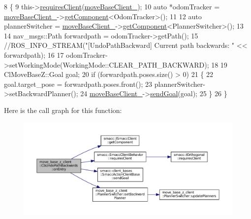 \begin{DoxyCode}
8 \{
9     this->\hyperlink{classsmacc_1_1SmaccClientBehavior_a917f001e763a1059af337bf4e164f542}{requiresClient}(\hyperlink{classmove__base__z__client_1_1CbUndoPathBackwards_a19e7ace85698725a1d2730a7c6b3aa7d}{moveBaseClient\_});
10     \textcolor{keyword}{auto} *odomTracker = \hyperlink{classmove__base__z__client_1_1CbUndoPathBackwards_a19e7ace85698725a1d2730a7c6b3aa7d}{moveBaseClient\_}->\hyperlink{classsmacc_1_1ISmaccClient_adef78db601749ca63c19e74a27cb88cc}{getComponent}<OdomTracker>();
11 
12     \textcolor{keyword}{auto} plannerSwitcher = \hyperlink{classmove__base__z__client_1_1CbUndoPathBackwards_a19e7ace85698725a1d2730a7c6b3aa7d}{moveBaseClient\_}->\hyperlink{classsmacc_1_1ISmaccClient_adef78db601749ca63c19e74a27cb88cc}{getComponent}<PlannerSwitcher>();
13 
14     nav\_msgs::Path forwardpath = odomTracker->getPath();
15     \textcolor{comment}{//ROS\_INFO\_STREAM("[UndoPathBackward] Current path backwards: " << forwardpath);}
16 
17     odomTracker->setWorkingMode(WorkingMode::CLEAR\_PATH\_BACKWARD);
18 
19     ClMoveBaseZ::Goal goal;
20     \textcolor{keywordflow}{if} (forwardpath.poses.size() > 0)
21     \{
22         goal.target\_pose = forwardpath.poses.front();
23         plannerSwitcher->setBackwardPlanner();
24         \hyperlink{classmove__base__z__client_1_1CbUndoPathBackwards_a19e7ace85698725a1d2730a7c6b3aa7d}{moveBaseClient\_}->\hyperlink{classsmacc_1_1client__bases_1_1SmaccActionClientBase_a9c47a5094ac8afb01680307fe5eca922}{sendGoal}(goal);
25     \}
26 \}
\end{DoxyCode}


Here is the call graph for this function\+:
\nopagebreak
\begin{figure}[H]
\begin{center}
\leavevmode
\includegraphics[width=350pt]{classmove__base__z__client_1_1CbUndoPathBackwards_a2793c69857aa97337d56ff79dee20508_cgraph}
\end{center}
\end{figure}




